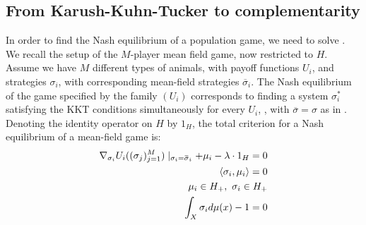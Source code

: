 \subsection{From Karush-Kuhn-Tucker to complementarity}
In order to find the Nash equilibrium of a population game, we need to solve . We recall the setup of the $M$-player mean field game, now restricted to $H$. Assume we have $M$ different types of animals, with payoff functions $U_i$, and strategies $\sigma_i$, with corresponding mean-field strategies $\overbar{\sigma}_i$.
The Nash equilibrium of the game specified by the family $(U_i)$ corresponds to finding a system $\sigma_i^*$ satisfying the KKT conditions simultaneously for every $U_i$, \citep{deimling2010nonlinear}, with $\overbar{\sigma}=\sigma$ as in . Denoting the identity operator on $H$ by $1_H$, the total criterion for a Nash equilibrium of a mean-field game  is:
\begin{equation}
  \label{eq:KKT_total}
  \begin{split}
  \nabla_{\sigma_i}U_i((\sigma_j)_{j=1}^M) \mid_{\sigma_i = \overbar{\sigma}_i}  + \mu_i - \lambda  \cdot 1_H = 0 \\
  \ip{\sigma_i}{\mu_i} = 0 \\
  \mu_i \in H_+,~\sigma_i \in H_+ \\
  \int_X \sigma_i d\mu(x)- 1 = 0
\end{split}
\end{equation}
